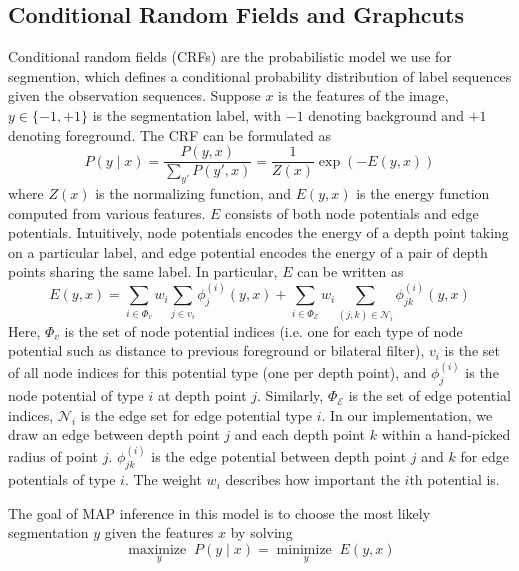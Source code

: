 \documentclass[10pt,twocolumn,letterpaper]{article}
\newcommand{\maximize}[1]{\underset{#1}{\operatorname{maximize}\;}}
\newcommand{\minimize}[1]{\underset{#1}{\operatorname{minimize}\;}}
\begin{document}
\subsection{Conditional Random Fields and Graphcuts}
Conditional random fields (CRFs) are the probabilistic model we use for segmention, which defines a conditional probability distribution of label sequences given the observation sequences. Suppose $x$ is the features of the image, $y \in \{-1, +1\}$ is the segmentation label, with $-1$ denoting background and $+1$ denoting foreground. The CRF can be formulated as
\begin{equation}
P(y\mid x) = \frac{P(y,x)}{\sum_{y'}P(y',x)}  = \frac{1}{Z(x)}\exp(-E(y,x)) 
\end{equation}
where $Z(x)$ is the normalizing function, and $E(y,x)$ is the energy function
computed from various features. $E$ consists of both node potentials and
edge potentials. Intuitively, node potentials encodes the energy of a depth point taking
on a particular label, and edge potential encodes the energy of a pair of depth points
sharing the same label. In particular, $E$ can be written as\cite{AlexRGB}
\begin{equation}
E(y,x) = \sum_{i\in \Phi_v} w_i \sum_{j \in v_i} \phi_j^{(i)}(y,x)
+ \sum_{i\in \Phi_{\mathcal{E}}} w_i \sum_{{(j,k)}\in \mathcal{N}_i} \phi_{jk}^{(i)}(y,x)
\end{equation}
Here, $\Phi_v$ is the set of node potential indices (i.e. one for each type of node
potential such as distance to previous foreground or bilateral filter), $v_i$ is the
set of all node indices for this potential type (one per depth point), and 
$\phi_j^{(i)}$ is the node potential of type $i$ at depth point $j$. Similarly,
$\Phi_\mathcal{E}$ is the set of edge potential indices, $\mathcal{N}_i$ is the 
edge set for edge potential type $i$. In our implementation, we draw an edge between depth point $j$ and each depth point $k$ within a hand-picked radius of point $j$. $\phi_{jk}^{(i)}$ is the edge potential between depth point $j$ and $k$
for edge potentials of type $i$. The weight $w_i$ describes how important the
$i$th potential is.

The goal of MAP inference in this model is to choose the most likely segmentation $y$ given the features $x$ by solving\cite{AlexRGB}
\begin{equation}
\maximize{y} P(y \mid x) = \minimize{y} E(y,x)
\end{equation}
\end{document}
